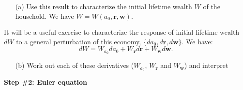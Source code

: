 \documentclass[11pt]{extarticle}
\theoremstyle{plain}
\theoremstyle{definition}
\begin{document}
\begin{enumerate}
\item [(a)] Use this result to characterize the initial lifetime wealth $W$ of the household. We have $W = W(a_0, \bm{r}, \bm{w})$. 
\end{enumerate}


\vspace{5mm}
\noindent
It will be a useful exercise to characterize the response of initial lifetime wealth $dW$ to a general perturbation of this economy, $\{da_0, d \bm r, d \bm w\}$. We have:
\begin{equation*}
	dW = W_{a_0} da_0 + W_{\bm r} d \bm{r} + W_{ \bm w} d \bm w. 
\end{equation*}


\begin{enumerate}
\item [(b)] Work out each of these derivatives ($ W_{a_0}$, $W_{\bm r}$ and $W_{ \bm w}$) and interpret 
\end{enumerate}


\vspace{5mm}
\noindent
\textbf{Step \#2: Euler equation }
\end{document}
